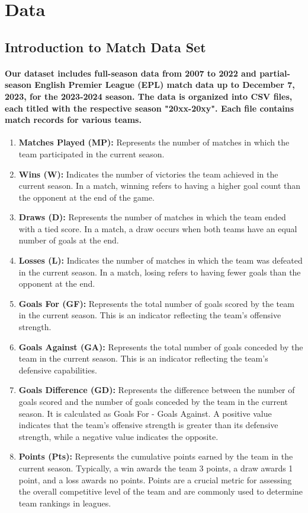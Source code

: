 \section{Data}
% 
% 
\subsection{Introduction to Match Data Set}
\paragraph{Our dataset includes full-season data from 2007 to 2022 and partial-season English Premier League (EPL) match data up to December 7, 2023, for the 2023-2024 season. The data is organized into CSV files, each titled with the respective season "20xx-20xy". Each file contains match records for various teams.}
\begin{enumerate}
    \item \textbf{Matches Played (MP):} Represents the number of matches in which the team participated in the current season.
    \item \textbf{Wins (W):} Indicates the number of victories the team achieved in the current season. In a match, winning refers to having a higher goal count than the opponent at the end of the game.
    \item \textbf{Draws (D):} Represents the number of matches in which the team ended with a tied score. In a match, a draw occurs when both teams have an equal number of goals at the end.
    \item \textbf{Losses (L):} Indicates the number of matches in which the team was defeated in the current season. In a match, losing refers to having fewer goals than the opponent at the end.
    \item \textbf{Goals For (GF):} Represents the total number of goals scored by the team in the current season. This is an indicator reflecting the team's offensive strength.
    \item \textbf{Goals Against (GA):} Represents the total number of goals conceded by the team in the current season. This is an indicator reflecting the team's defensive capabilities.
    \item \textbf{Goals Difference (GD):} Represents the difference between the number of goals scored and the number of goals conceded by the team in the current season. It is calculated as Goals For - Goals Against. A positive value indicates that the team's offensive strength is greater than its defensive strength, while a negative value indicates the opposite.
    \item \textbf{Points (Pts):} Represents the cumulative points earned by the team in the current season. Typically, a win awards the team 3 points, a draw awards 1 point, and a loss awards no points. Points are a crucial metric for assessing the overall competitive level of the team and are commonly used to determine team rankings in leagues.
\end{enumerate}
